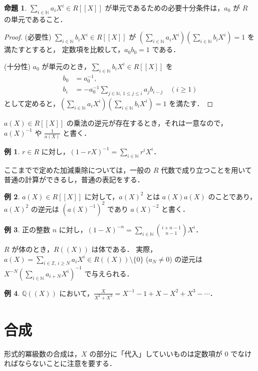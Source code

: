 \documentclass{jsarticle}
\newcommand{\N}{\mathbb{N}}
\newcommand{\Q}{\mathbb{Q}}
\newcommand{\Z}{\mathbb{Z}}
\theoremstyle{definition}
\newtheorem*{Exm}{例}
\newtheorem{Prp}{命題}
\newenvironment{exm}{\begin{leftbar}\begin{Exm}}{\end{Exm}\end{leftbar}}
\newenvironment{prp}{\vspace{1ex}\begin{screen}\begin{Prp}}{\end{Prp}\end{screen}}
\newenvironment{prf}{\begin{leftbar}\begin{proof}}{\end{proof}\end{leftbar}}
\begin{document}
\begin{prp}
  $\sum_{i\in\N} a_i X^i \in R[[X]]$ が単元であるための必要十分条件は，$a_0$ が $R$ の単元であること．
\end{prp}
\begin{prf}
  (必要性)
  $\sum_{i\in\N} b_i X^i \in R[[X]]$ が $\left(\sum_{i\in\N} a_i X^i\right) \left(\sum_{i\in\N} b_i X^i\right) = 1$ を満たすとすると，
  定数項を比較して，$a_0 b_0 = 1$ である．

  (十分性)
  $a_0$ が単元のとき，$\sum_{i\in\N} b_i X^i \in R[[X]]$ を
  \begin{align*}
    b_0 &= a_0^{-1}, \\
    b_i &= -a_0^{-1} \sum_{j\in\N,\,1\le j\le i} a_j b_{i-j} \quad (i \ge 1)
  \end{align*}
  として定めると，$\left(\sum_{i\in\N} a_i X^i\right) \left(\sum_{i\in\N} b_i X^i\right) = 1$ を満たす．
\end{prf}

$a(X) \in R[[X]]$ の乗法の逆元が存在するとき，それは一意なので，
$a(X)^{-1}$ や $\frac{1}{a(X)}$ と書く．

\begin{exm}
  $r \in R$ に対し，$(1 - r X)^{-1} = \sum_{i\in\N} r^i X^i$．
\end{exm}

ここまでで定めた加減乗除については，一般の $R$ 代数で成り立つことを用いて普通の計算ができるし，普通の表記をする．

\begin{exm}
  $a(X) \in R[[X]]$ に対して，$a(X)^2$ とは $a(X) a(X)$ のことであり，
  $a(X)^2$ の逆元は $(a(X)^{-1})^2$ であり $a(X)^{-2}$ と書く．
\end{exm}

\begin{exm}
  正の整数 $n$ に対し，$(1 - X)^{-n} = \sum_{i\in\N} \binom{i+n-1}{n-1} X^i$．
\end{exm}

$R$ が体のとき，$R((X))$ は体である．
実際，$a(X) = \sum_{i\in\Z,\,i\ge N} a_i X^i \in R((X)) \setminus \{0\}$ ($a_N \ne 0$) の逆元は
$X^{-N} \left(\sum_{i\in\N} a_{i+N} X^i\right)^{-1}$ で与えられる．

\begin{exm}
  $\Q((X))$ において，$\frac{X}{X^2 + X^3} = X^{-1} - 1 + X - X^2 + X^3 - \cdots$．
\end{exm}


\section{合成}
形式的冪級数の合成は，$X$ の部分に「代入」していいものは定数項が $0$ でなければならないことに注意を要する．
\end{document}
